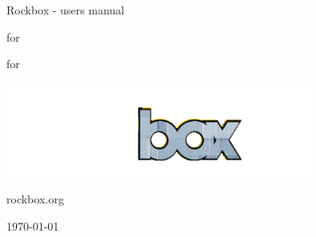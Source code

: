 \thispagestyle{empty}
\vspace*{0.3cm}
\begin{center}

\Huge {Rockbox - users manual}

\Huge {for }

\Huge {for \playername}


\includegraphics[width=10cm]{frontpage/rockbox3540}

\large rockbox.org


\today

\end{center}

\pagebreak
\thispagestyle{empty}
\cleardoublepage

